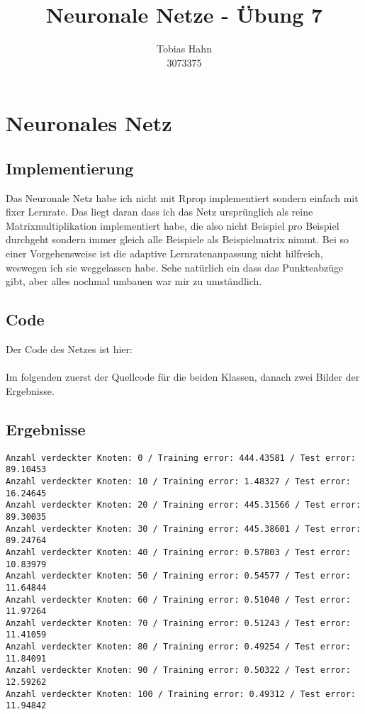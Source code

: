 \documentclass{article}
\title{Neuronale Netze - Übung 7}
\author{Tobias Hahn\\ 3073375}
\begin{document}
\maketitle
\newpage
\section{Neuronales Netz}
\subsection{Implementierung}
Das Neuronale Netz habe ich nicht mit Rprop implementiert sondern einfach mit fixer Lernrate. Das liegt daran dass ich das Netz ursprünglich als reine Matrixmultiplikation implementiert habe, die also nicht Beispiel pro Beispiel durchgeht sondern immer gleich alle Beispiele als Beispielmatrix nimmt. Bei so einer Vorgehensweise ist die adaptive Lernratenanpassung nicht hilfreich, weswegen ich sie weggelassen habe. Sehe natürlich ein dass das Punkteabzüge gibt, aber alles nochmal umbauen war mir zu umständlich.

\subsection{Code}
Der Code des Netzes ist hier:

\paragraph{}
Im folgenden zuerst der Quellcode für die beiden Klassen, danach zwei Bilder der Ergebnisse.
\paragraph{}



\subsection{Ergebnisse}
\begin{lstlisting}
Anzahl verdeckter Knoten: 0 / Training error: 444.43581 / Test error: 89.10453
Anzahl verdeckter Knoten: 10 / Training error: 1.48327 / Test error: 16.24645
Anzahl verdeckter Knoten: 20 / Training error: 445.31566 / Test error: 89.30035
Anzahl verdeckter Knoten: 30 / Training error: 445.38601 / Test error: 89.24764
Anzahl verdeckter Knoten: 40 / Training error: 0.57803 / Test error: 10.83979
Anzahl verdeckter Knoten: 50 / Training error: 0.54577 / Test error: 11.64844
Anzahl verdeckter Knoten: 60 / Training error: 0.51040 / Test error: 11.97264
Anzahl verdeckter Knoten: 70 / Training error: 0.51243 / Test error: 11.41059
Anzahl verdeckter Knoten: 80 / Training error: 0.49254 / Test error: 11.84091
Anzahl verdeckter Knoten: 90 / Training error: 0.50322 / Test error: 12.59262
Anzahl verdeckter Knoten: 100 / Training error: 0.49312 / Test error: 11.94842
\end{lstlisting}
\end{document}
